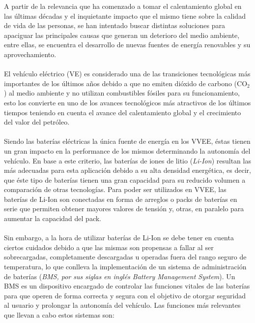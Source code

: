 \documentclass[10pt,a4paper]{article}
\begin{document}
	\noindent A partir de la relevancia que ha comenzado a tomar el calentamiento global en las últimas décadas y el inquietante impacto que el mismo tiene sobre la calidad de vida de las personas, se han intentado buscar distintas soluciones para apaciguar las principales causas que generan un deterioro del medio ambiente, entre ellas, se encuentra el desarrollo de nuevas fuentes de energía renovables y su aprovechamiento.\\ 
	\\
	\noindent El vehículo eléctrico (VE) es considerado una de las transiciones tecnológicas más importantes de los últimos años debido a que no emiten dióxido de carbono ($\mathrm{CO_2}$) al medio ambiente y no utilizan combustibles fósiles para su funcionamiento, esto los convierte en uno de los avances tecnológicos más atractivos de los últimos tiempos teniendo en cuenta el avance del calentamiento global y el crecimiento del valor del petróleo.\\
	\\
	\noindent Siendo las baterías eléctricas la única fuente de energía en los VVEE, éstas tienen un gran impacto en la performance de los mismos determinando la autonomía del vehículo. En base a este criterio, las baterías de iones de litio (\emph{Li-Ion}) resultan las más adecuadas para esta aplicación debido a su alta densidad energética, es decir, que éste tipo de baterías tienen una gran capacidad para su reducido volumen a comparación de otras tecnologías. Para poder ser utilizados en VVEE, las baterías de Li-Ion son conectadas en forma de arreglos o packs de baterías en serie que permiten obtener mayores valores de tensión y, otras, en paralelo para aumentar la capacidad del pack. \\
	\\
	\noindent Sin embargo, a la hora de utilizar baterías de Li-Ion se debe tener en cuenta ciertos cuidados debido a que las mismas son propensas a fallar al ser sobrecargadas, completamente descargadas u operadas fuera del rango seguro de temperatura, lo que conlleva la implementación de un sistema de administración de baterías (\emph{BMS, por sus siglas en inglés Battery Management System}). Un BMS es un dispositivo encargado de controlar las funciones vitales de las baterías para que operen de forma correcta y segura con el objetivo de otorgar seguridad al usuario y prolongar la autonomía del vehículo. Las funciones más relevantes que llevan a cabo estos sistemas son:
	
\end{document}
